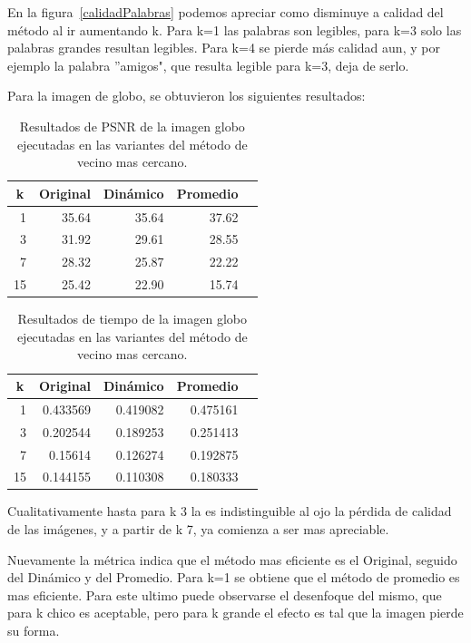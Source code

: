 \documentclass[a4paper]{article}
\newcounter{col}
\begin{document}
En la figura~\ref{calidadPalabras} podemos apreciar como disminuye a calidad del método al ir aumentando k. Para k=1 las palabras son legibles, para k=3 solo las palabras grandes resultan legibles. Para k=4 se pierde m\'as calidad aun, y por ejemplo la palabra ''amigos", que resulta legible para k=3, deja de serlo.


Para la imagen de globo, se obtuvieron los siguientes resultados:


\begin{table}[H]
\centering
\begin{tabular}{|r|r|r|r|r|}
\hline
\multicolumn{1}{|c|}{k} & \multicolumn{1}{c|}{Original} & \multicolumn{1}{c|}{Dinámico} & \multicolumn{1}{c|}{Promedio} \\ \hline
1 & 35.64 & 35.64& 37.62 \\ \hline
3 & 31.92 &  29.61 & 28.55 \\ \hline
7 & 28.32 &  25.87 & 22.22 \\ \hline
15 &25.42&  22.90 & 15.74 \\ \hline
\end{tabular}
\caption{Resultados de PSNR de la imagen globo ejecutadas en las variantes del m\'etodo de vecino mas cercano.}
\label{}
\end{table}

\begin{table}[H]
\centering
\begin{tabular}{|r|r|r|r|r|}
\hline
\multicolumn{1}{|c|}{k} & \multicolumn{1}{c|}{Original} & \multicolumn{1}{c|}{Dinámico} & \multicolumn{1}{c|}{Promedio} \\ \hline
1 & 0.433569 & 0.419082& 0.475161 \\ \hline
3 & 0.202544 &  0.189253 & 0.251413 \\ \hline
7 &  0.15614 &  0.126274 & 0.192875 \\ \hline
15 &0.144155&  0.110308 & 0.180333 \\ \hline
\end{tabular}
\caption{Resultados de tiempo de la imagen globo ejecutadas en las variantes del m\'etodo de vecino mas cercano.}
\label{}
\end{table}



Cualitativamente hasta para k 3 la es indistinguible al ojo la p\'erdida de calidad de las imágenes, y a partir de k 7, ya comienza a ser mas apreciable.

Nuevamente la métrica indica que el método mas eficiente es el Original, seguido del Dinámico y del Promedio. Para k=1 se obtiene que el método de promedio es mas eficiente. Para este ultimo puede observarse el desenfoque del mismo, que para k chico es aceptable, pero para k grande el efecto es tal que la imagen pierde su forma.
\end{document}
